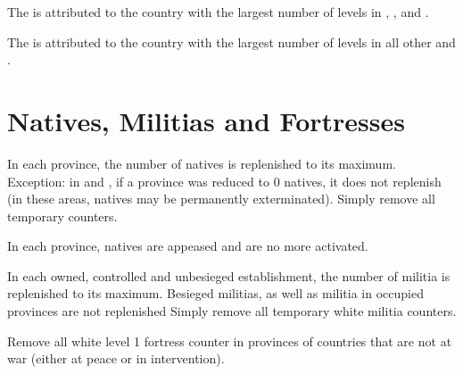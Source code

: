 \aparag[Indian] The  is attributed to the country with the largest
number of \TradeFLEET levels in , ,  and
.

\aparag[Atlantic] The  is attributed to the country with the
largest number of \TradeFLEET levels in all other \STZ and \CTZ.

\section{Natives, Militias and Fortresses}
\label{chInter:Natives, Militias, Fortresses}

\aparag[Natives] In each \ROTW province, the number of natives is replenished
to its maximum.
\bparag Exception: in \continentAmerica and \continentSiberia, if a province
was reduced to 0 natives, it does not replenish (in these areas, natives may
be permanently exterminated).
\bparag Simply remove all temporary  counters.

\aparag[Appeasement] In each \ROTW province, natives are appeased and are no
more activated.

\aparag[Militia] In each owned, controlled and unbesieged establishment, the
number of militia is replenished to its maximum.
\bparag Besieged militias, as well as militia in occupied provinces are not
replenished
\bparag Simply remove all temporary white militia counters.

\aparag[Fortresses] Remove all white level 1 fortress counter in provinces of
countries that are not at war (either at peace or in intervention).

\section{\VPs}

